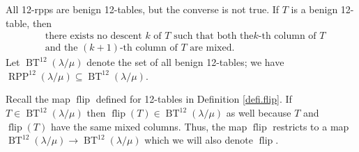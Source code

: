 \documentclass[12pt]{article}
\theoremstyle{plain}
\theoremstyle{definition}
\def\OneTwoRPP{{\operatorname{RPP}^{12}\left(  \lambda/\mu\right)}}
\def\BenignTables{{\operatorname{BT}^{12}\left(  \lambda/\mu\right)}}
\def\flip{{\operatorname{flip}}}
\begin{document}

All 12-rpps are benign 12-tables, but the converse is not true. If $T$ is a benign 12-table, then%
\begin{align}
&  \text{there exists no descent }k\text{ of }T\text{ such that both the
}k\text{-th column of }T\nonumber\\
&  \text{and the }\left(  k+1\right)  \text{-th column of }T\text{ are mixed.}
\label{eq.benign.not-both-mixed}%
\end{align}
Let $\BenignTables$ denote the set of all benign 12-tables; we have $\OneTwoRPP\subseteq\BenignTables$.

Recall the map $\flip$ defined for 12-tables in Definition \ref{defi.flip}. If $T\in\BenignTables$ then $\flip(T)\in\BenignTables$ as well because $T$ and $\flip(T)$ have the same mixed columns. Thus, the map $\flip$ restricts to a map $\BenignTables\to\BenignTables$ which we will also denote $\flip$. 
\end{document}
